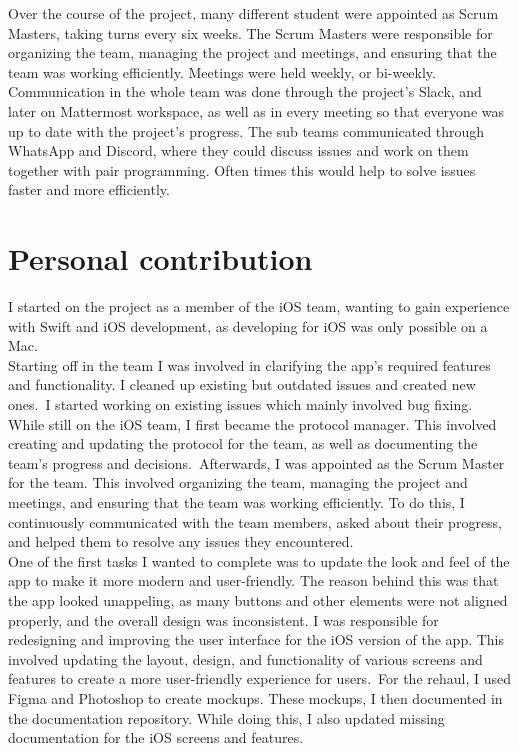 \documentclass[sf-font,usefira,english]{uulm/sp/article}
\begin{document}
Over the course of the project, many different student were appointed as Scrum Masters, taking turns every six weeks.
The Scrum Masters were responsible for organizing the team,
managing the project and meetings, and ensuring that the team was working efficiently.
Meetings were held weekly, or bi-weekly.
Communication in the whole team was done through the project's Slack, and later on Mattermost workspace,
as well as in every meeting so that everyone was up to date with the project's progress.
The sub teams communicated through WhatsApp and Discord, 
where they could discuss issues and work on them together with pair programming.
Often times this would help to solve issues faster and more efficiently.\\



\section{Personal contribution}

I started on the project as a member of the iOS team,
wanting to gain experience with Swift and iOS development,
as developing for iOS was only possible on a Mac.\\

Starting off in the team I was involved in 
clarifying the app's required features and functionality.
I cleaned up existing but outdated issues and created new ones.\
I started working on existing issues which mainly involved bug fixing.\\

While still on the iOS team, I first became the protocol manager.
This involved creating and updating the protocol for the team,
as well as documenting the team's progress and decisions.\
Afterwards, I was appointed as the Scrum Master for the team.
This involved organizing the team, managing the project and meetings,
and ensuring that the team was working efficiently.
To do this, I continuously communicated with the team members,
asked about their progress, and helped them to resolve any issues they encountered.
\\

One of the first tasks I wanted to complete was 
to update the look and feel of the app to make it more modern and user-friendly.
The reason behind this was that the app looked unappeling,
as many buttons and other elements were not aligned properly,
and the overall design was inconsistent.
I was responsible for redesigning and improving the user interface 
for the iOS version of the app. 
This involved updating the layout, design, and functionality 
of various screens and features to create a more user-friendly 
experience for users.\
For the rehaul, I used Figma and Photoshop to create mockups.
These mockups, I then documented in the documentation repository.
While doing this, I also updated missing documentation
for the iOS screens and features.\\
\end{document}
